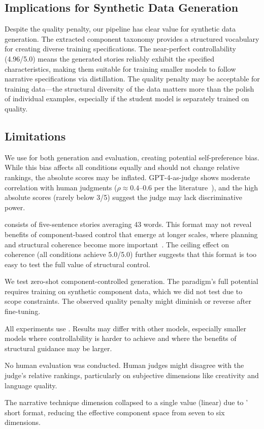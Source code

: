 \subsection{Implications for Synthetic Data Generation}

Despite the quality penalty, our pipeline has clear value for synthetic data generation.
The extracted component taxonomy provides a structured vocabulary for creating diverse training specifications.
The near-perfect controllability (4.96/5.0) means the generated stories reliably exhibit the specified characteristics, making them suitable for training smaller models to follow narrative specifications via distillation.
The quality penalty may be acceptable for training data---the structural diversity of the data matters more than the polish of individual examples, especially if the student model is separately trained on quality.

\subsection{Limitations}
\label{sec:limitations}

We use \gptfour for both generation and evaluation, creating potential self-preference bias.
While this bias affects all conditions equally and should not change relative rankings, the absolute scores may be inflated.
GPT-4-as-judge shows moderate correlation with human judgments ($\rho \approx 0.4$--$0.6$ per the literature~\cite{huot2024agentsroom,xie2024weaver}), and the high absolute scores (rarely below 3/5) suggest the judge may lack discriminative power.

\rocstories consists of five-sentence stories averaging 43 words.
This format may not reveal benefits of component-based control that emerge at longer scales, where planning and structural coherence become more important~\cite{yang2023doc,huot2024agentsroom}.
The ceiling effect on coherence (all conditions achieve 5.0/5.0) further suggests that this format is too easy to test the full value of structural control.

We test zero-shot component-controlled generation.
The \skillmix paradigm's full potential requires training on synthetic component data, which we did not test due to scope constraints.
The observed quality penalty might diminish or reverse after fine-tuning.

All experiments use \gptfour.
Results may differ with other models, especially smaller models where controllability is harder to achieve and where the benefits of structural guidance may be larger.

No human evaluation was conducted.
Human judges might disagree with the \gptfour judge's relative rankings, particularly on subjective dimensions like creativity and language quality.

The narrative technique dimension collapsed to a single value (linear) due to \rocstories' short format, reducing the effective component space from seven to six dimensions.
